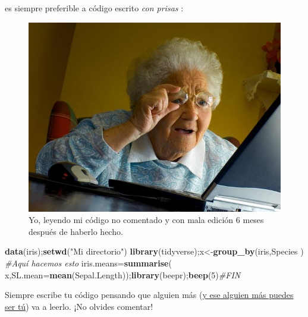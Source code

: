 \documentclass[
]{book}
\newenvironment{Shaded}{\begin{snugshade}}{\end{snugshade}}
\newcommand{\CommentTok}[1]{\textcolor[rgb]{0.56,0.35,0.01}{\textit{#1}}}
\newcommand{\DataTypeTok}[1]{\textcolor[rgb]{0.13,0.29,0.53}{#1}}
\newcommand{\DecValTok}[1]{\textcolor[rgb]{0.00,0.00,0.81}{#1}}
\newcommand{\KeywordTok}[1]{\textcolor[rgb]{0.13,0.29,0.53}{\textbf{#1}}}
\newcommand{\NormalTok}[1]{#1}
\newcommand{\StringTok}[1]{\textcolor[rgb]{0.31,0.60,0.02}{#1}}
\begin{document}
es siempre preferible a código escrito \emph{con prisas} :

\begin{figure}

{\centering \includegraphics[width=8.89in]{images/Grandma-Finds-The-Internet} 

}

\caption{Yo, leyendo mi código no comentado y con mala edición 6 meses después de haberlo hecho.}\label{fig:unnamed-chunk-90}
\end{figure}

\begin{Shaded}
\begin{Highlighting}[]
\KeywordTok{data}\NormalTok{(iris);}\KeywordTok{setwd}\NormalTok{(}\StringTok{"Mi directorio"}\NormalTok{)}
\KeywordTok{library}\NormalTok{(tidyverse);x<-}\KeywordTok{group_by}\NormalTok{(iris,Species  )}
\CommentTok{#Aquí hacemos esto}
\NormalTok{iris.means=}\KeywordTok{summarise}\NormalTok{( x,}\DataTypeTok{SL.mean=}\KeywordTok{mean}\NormalTok{(Sepal.Length));}\KeywordTok{library}\NormalTok{(beepr);}\KeywordTok{beep}\NormalTok{(}\DecValTok{5}\NormalTok{)}\CommentTok{#FIN}
\end{Highlighting}
\end{Shaded}

Siempre escribe tu código pensando que alguien más (\href{https://www.redaccionmedica.com/virico/noticias/el-gato-de-schrodinger-y-por-que-no-abrir-la-puerta-cerrada-de-la-consulta-5188}{y ese alguien más puedes ser tú}) va a leerlo. ¡No olvides comentar!

  
\end{document}
